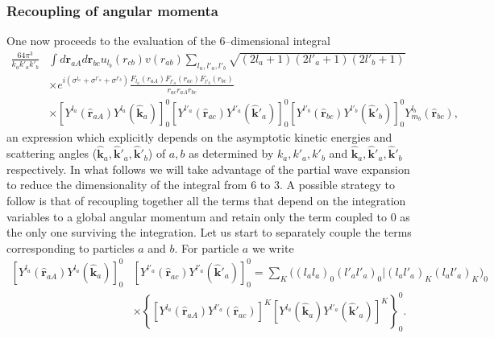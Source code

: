 \subsubsection{Recoupling of angular momenta}
One now proceeds to the evaluation of the 6--dimensional integral
\begin{equation}\label{eqC6AppF14}
\begin{split}
\frac{64\pi^3}{k_ak'_ak'_b}&\int d\mathbf{r}_{aA}d \mathbf{r}_{bc}u_{l_b}(r_{cb})v(r_{ab})\sum_{l_a,l'_a,l'_b}\sqrt{(2l_a+1)(2l'_a+1)(2l'_b+1)}\\
&\times e^{i(\sigma^{l_a}+\sigma^{l'_a}+\sigma^{l'_b})} \frac{F_{l_a}(r_{aA})  F_{l'_a}(r_{ac})F_{l'_b}(r_{bc})}{r_{ac}r_{aA}r_{bc}}\\
&\times \left[ Y^{l_a} (\hat{\mathbf r}_{aA}) Y^{l_a} (\hat{ \mathbf k}_{a})\right]^0_0\left[ Y^{l'_a} (\hat{\mathbf r}_{ac}) Y^{l'_a} (\hat{ \mathbf k}'_{a})\right]^0_0\left[ Y^{l'_b} (\hat{\mathbf r}_{bc}) Y^{l'_b} (\hat{ \mathbf k}'_{b})\right]^0_0Y^{l_b}_{m_b}(\hat{\mathbf{r}}_{bc}),
\end{split}
\end{equation}
an  expression which explicitly depends  on the asymptotic kinetic energies  and scattering angles  ($\hat{ \mathbf k}_{a},\hat{ \mathbf k}'_{a},\hat{ \mathbf k}'_{b}$) of $a,b$ as determined by $k_a,k'_a,k'_b$ and $\hat{ \mathbf k}_{a},\hat{ \mathbf k}'_{a},\hat{ \mathbf k}'_{b}$ respectively.
In what follows we will take advantage of the partial wave expansion to reduce the dimensionality of the integral from 6 to 3. A possible strategy to follow is that of recoupling together all the terms that depend on the integration variables to a global angular momentum and retain  only the term coupled to 0 as the only one surviving the integration.
Let us start to separately couple  the terms corresponding to particles $a$ and  $b$. For particle $a$ we write
\begin{equation}\label{eqC6AppG10}
\begin{split}
\left[ Y^{l_a} (\hat{\mathbf r}_{aA}) Y^{l_a} (\hat{ \mathbf k}_{a})\right]^0_0 & \left[ Y^{l'_a} (\hat{\mathbf r}_{ac}) Y^{l'_a} (\hat{ \mathbf k}'_{a})\right]^0_0=\sum_K \bigl((l_a l_a)_0(l'_a l'_a)_0|(l_a l'_a)_K(l_a l'_a)_K\bigr)_0\\
& \times \left\{\left[ Y^{l_a} (\hat{\mathbf r}_{aA}) Y^{l'_a} (\hat{ \mathbf r}_{ac})\right]^K \left[Y^{l_a} (\hat{\mathbf k}_{a}) Y^{l'_a} (\hat{ \mathbf k}'_{a})\right]^K\right\}^0_0.
\end{split}
\end{equation}
